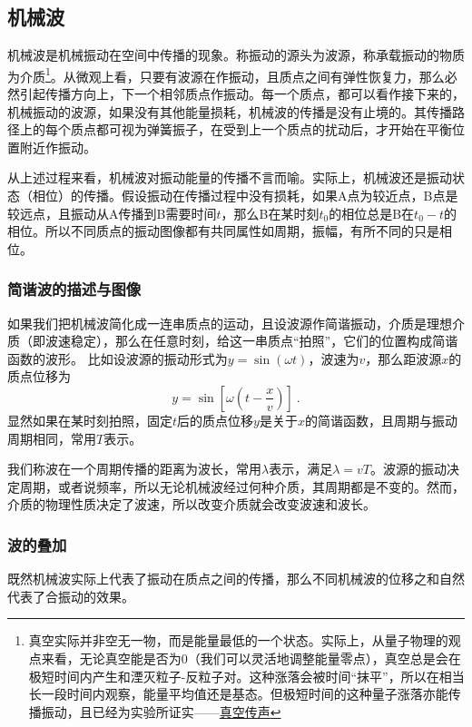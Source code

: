 
\subsection{机械波}
机械波是机械振动在空间中传播的现象。称振动的源头为波源，称承载振动的物质为介质\footnote{真空实际并非空无一物，而是能量最低的一个状态。实际上，从量子物理的观点来看，无论真空能是否为0（我们可以灵活地调整能量零点），真空总是会在极短时间内产生和湮灭粒子-反粒子对。这种涨落会被时间“抹平”，所以在相当长一段时间内观察，能量平均值还是基态。但极短时间的这种量子涨落亦能传播振动，且已经为实验所证实——\href{https://www.rmzxw.com.cn/c/2023-08-25/3399291.shtml}{真空传声}}。从微观上看，只要有波源在作振动，且质点之间有弹性恢复力，那么必然引起传播方向上，下一个相邻质点作振动。每一个质点，都可以看作接下来的，机械振动的波源，如果没有其他能量损耗，机械波的传播是没有止境的。其传播路径上的每个质点都可视为弹簧振子，在受到上一个质点的扰动后，才开始在平衡位置附近作振动。

从上述过程来看，机械波对振动能量的传播不言而喻。实际上，机械波还是振动状态（相位）的传播。假设振动在传播过程中没有损耗，如果A点为较近点，B点是较远点，且振动从A传播到B需要时间$t$，那么B在某时刻$t_0$的相位总是B在$t_0-t$的相位。所以不同质点的振动图像都有共同属性如周期，振幅，有所不同的只是相位。
\subsubsection{简谐波的描述与图像}
如果我们把机械波简化成一连串质点的运动，且设波源作简谐振动，介质是理想介质（即波速稳定），那么在任意时刻，给这一串质点“拍照”，它们的位置构成简谐函数的波形。
比如设波源的振动形式为$y=\sin(\omega t)$，波速为$v$，那么距波源$x$的质点位移为
\begin{equation}
y=\sin [\omega (t-\frac{x}{v})]~.
\end{equation}
显然如果在某时刻拍照，固定$t$后的质点位移$y$是关于$x$的简谐函数，且周期与振动周期相同，常用$T$表示。%

我们称波在一个周期传播的距离为波长，常用$\lambda $表示，满足$\lambda=vT$。波源的振动决定周期，或者说频率，所以无论机械波经过何种介质，其周期都是不变的。然而，介质的物理性质决定了波速，所以改变介质就会改变波速和波长。
\subsubsection{波的叠加}
既然机械波实际上代表了振动在质点之间的传播，那么不同机械波的位移之和自然代表了合振动的效果。
